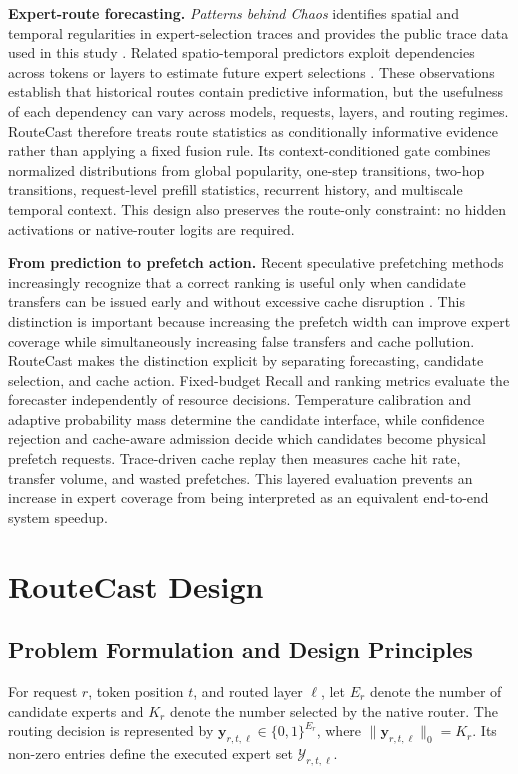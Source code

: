 \documentclass[conference]{IEEEtran}
\begin{document}
\textbf{Expert-route forecasting.}
\emph{Patterns behind Chaos} identifies spatial and temporal regularities in
expert-selection traces and provides the public trace data used in this study
\cite{patterns}. Related spatio-temporal predictors exploit dependencies
across tokens or layers to estimate future expert selections \cite{stmoe}.
These observations establish that historical routes contain predictive
information, but the usefulness of each dependency can vary across models,
requests, layers, and routing regimes. RouteCast therefore treats route
statistics as conditionally informative evidence rather than applying a fixed
fusion rule. Its context-conditioned gate combines normalized distributions
from global popularity, one-step transitions, two-hop transitions,
request-level prefill statistics, recurrent history, and multiscale temporal
context. This design also preserves the route-only constraint: no hidden
activations or native-router logits are required.

\textbf{From prediction to prefetch action.}
Recent speculative prefetching methods increasingly recognize that a correct
ranking is useful only when candidate transfers can be issued early and
without excessive cache disruption \cite{specmd,specprefetch}. This distinction
is important because increasing the prefetch width can improve expert coverage
while simultaneously increasing false transfers and cache pollution.
RouteCast makes the distinction explicit by separating forecasting, candidate
selection, and cache action. Fixed-budget Recall and ranking metrics evaluate
the forecaster independently of resource decisions. Temperature calibration
and adaptive probability mass determine the candidate interface, while
confidence rejection and cache-aware admission decide which candidates become
physical prefetch requests. Trace-driven cache replay then measures cache hit
rate, transfer volume, and wasted prefetches. This layered evaluation prevents
an increase in expert coverage from being interpreted as an equivalent
end-to-end system speedup.

\section{RouteCast Design}
\subsection{Problem Formulation and Design Principles}

For request $r$, token position $t$, and routed layer $\ell$, let $E_r$
denote the number of candidate experts and $K_r$ denote the number selected by
the native router. The routing decision is represented by
$\mathbf{y}_{r,t,\ell}\in\{0,1\}^{E_r}$, where
$\|\mathbf{y}_{r,t,\ell}\|_0=K_r$. Its non-zero entries define the executed
expert set $\mathcal{Y}_{r,t,\ell}$.
\end{document}
